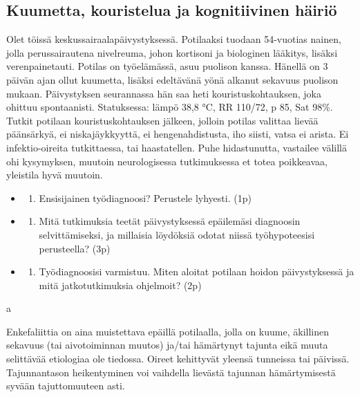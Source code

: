 \documentclass[
]{book}
\providecommand{\tightlist}{%
  \setlength{\itemsep}{0pt}\setlength{\parskip}{0pt}}
\begin{document}
\subsection{Kuumetta, kouristelua ja kognitiivinen häiriö}\label{kuumetta-kouristelua-ja-kognitiivinen-huxe4iriuxf6}

Olet töissä keskussairaalapäivystyksessä. Potilaaksi tuodaan 54-vuotias nainen, jolla perussairautena nivelreuma, johon kortisoni ja biologinen lääkitys, lisäksi verenpainetauti. Potilas on työelämässä, asuu puolison kanssa. Hänellä on 3 päivän ajan ollut kuumetta, lisäksi edeltävänä yönä alkanut sekavuus puolison mukaan. Päivystyksen seurannassa hän saa heti kouristuskohtauksen, joka ohittuu spontaanisti. Statuksessa: lämpö 38,8 °C, RR 110/72, p 85, Sat 98\%. Tutkit potilaan kouristuskohtauksen jälkeen, jolloin potilas valittaa lievää päänsärkyä, ei niskajäykkyyttä, ei hengenahdistusta, iho siisti, vatsa ei arista. Ei infektio-oireita tutkittaessa, tai haastatellen. Puhe hidastunutta, vastailee välillä ohi kysymyksen, muutoin neurologisessa tutkimuksessa et totea poikkeavaa, yleistila hyvä muutoin.

\begin{itemize}
\tightlist
\item
  \begin{enumerate}
  \def\labelenumi{\alph{enumi}.}
  \tightlist
  \item
    Ensisijainen työdiagnoosi? Perustele lyhyesti. (1p)
  \end{enumerate}
\item
  \begin{enumerate}
  \def\labelenumi{\alph{enumi}.}
  \setcounter{enumi}{1}
  \tightlist
  \item
    Mitä tutkimuksia teetät päivystyksessä epäilemäsi diagnoosin selvittämiseksi, ja millaisia löydöksiä odotat niissä työhypoteesisi perusteella? (3p)
  \end{enumerate}
\item
  \begin{enumerate}
  \def\labelenumi{\alph{enumi}.}
  \setcounter{enumi}{2}
  \tightlist
  \item
    Työdiagnoosisi varmistuu. Miten aloitat potilaan hoidon päivystyksessä ja mitä jatkotutkimuksia ohjelmoit? (2p)
  \end{enumerate}
\end{itemize}

a

Enkefaliittia on aina muistettava epäillä potilaalla, jolla on kuume, äkillinen sekavuus (tai aivotoiminnan muutos) ja/tai hämärtynyt tajunta eikä muuta selittävää etiologiaa ole tiedossa. Oireet kehittyvät yleensä tunneissa tai päivissä. Tajunnantason heikentyminen voi vaihdella lievästä tajunnan hämärtymisestä syvään tajuttomuuteen asti.
\end{document}
